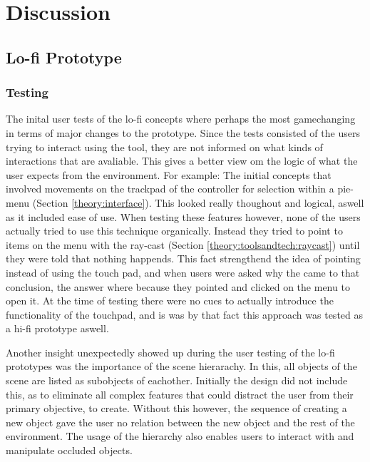 
\chapter{Discussion}
\section{Lo-fi Prototype}
\subsection{Testing}
The inital user tests of the lo-fi concepts where perhaps the most gamechanging in terms of major changes to the prototype. Since the tests consisted of the users trying to interact using the tool, they are not informed on what kinds of interactions that are avaliable. This gives a better view om the logic of what the user expects from the environment. For example: The initial concepts that involved movements on the trackpad of the controller for selection within a pie-menu (Section \ref{theory:interface}). This looked really thoughout and logical, aswell as it included ease of use. When testing these features however, none of the users actually tried to use this technique organically. Instead they tried to point to items on the menu with the ray-cast (Section \ref{theory:toolsandtech:raycast}) until they were told that nothing happends. This fact strengthend the idea of pointing instead of using the touch pad, and when users were asked why the came to that conclusion, the answer where because they pointed and clicked on the menu to open it. At the time of testing there were no cues to actually introduce the functionality of the touchpad, and is was by that fact this approach was tested as a hi-fi prototype aswell.

Another insight unexpectedly showed up during the user testing of the lo-fi prototypes was the importance of the scene hierarachy. In this, all objects of the scene are listed as subobjects of eachother. Initially the design did not include this, as to eliminate all complex features that could distract the user from their primary objective, to create. Without this however, the sequence of creating a new object gave the user no relation between the new object and the rest of the environment. The usage of the hierarchy also enables users to interact with and manipulate occluded objects. 
